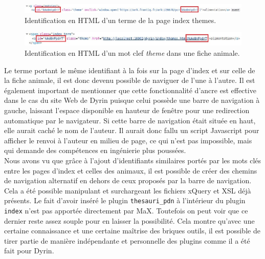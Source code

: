 \documentclass[a4paper,12pt,twoside]{book}
\begin{document}
\begin{figure}[H]
    \centering
    \includegraphics[width=\linewidth]{img/partie_3/ancre_theme.JPG}
    \caption{Identification en \acrshort{HTML} d'un terme de la page index themes.}
    \label{ancre_theme}
\end{figure}

\begin{figure}[H]
    \centering
    \includegraphics[width=\linewidth]{img/partie_3/eider_ancre.JPG}
    \caption{Identification en \acrshort{HTML} d'un mot clef \textit{theme} dans une fiche animale.}
    \label{eider_ancre}
\end{figure}

Le terme portant le même identifiant à la fois sur la page d'index et sur celle de la fiche animale, il est donc devenu possible de naviguer de l'une à l'autre. Il est également important de mentionner que cette fonctionnalité d'ancre est effective dans le cas du site Web de Dyrin puisque celui possède une barre de navigation à gauche, laissant l'espace disponible en hauteur de fenêtre pour une redirection automatique par le navigateur. Si cette barre de navigation était située en haut, elle aurait caché le nom de l'auteur. Il aurait donc fallu un script Javascript pour afficher le renvoi à l'auteur en milieu de page, ce qui n'est pas impossible, mais qui demande des compétences en ingénierie plus poussées.\\

Nous avons vu que grâce à l'ajout d'identifiants similaires portés par les mots clés entre les pages d'index et celles des animaux, il est possible de créer des chemins de navigation alternatif en dehors de ceux proposés par la barre de navigation. Cela a été possible manipulant et surchargeant les fichiers xQuery et \acrshort{XSL} déjà présents. Le fait d'avoir inséré le plugin \texttt{thesauri\_pdn} à l'intérieur du plugin \texttt{index} n'est pas apportée directement par MaX. Toutefois on peut voir que ce dernier reste assez souple pour en laisser la possibilité. Cela montre qu'avec une certaine connaissance et une certaine maîtrise des briques outils, il est possible de tirer partie de manière indépendante et personnelle des plugins comme il a été fait pour Dyrin.
\end{document}
